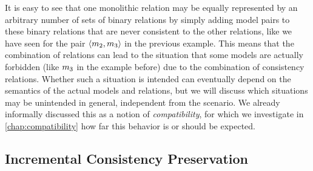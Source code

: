 It is easy to see that one monolithic relation may be equally represented by an arbitrary number of sets of binary relations by simply adding model pairs to these binary relations that are never consistent to the other relations, like we have seen for the pair $\langle m_{2}, m_{3} \rangle$ in the previous example.
This means that the combination of relations can lead to the situation that some models are actually forbidden (like $m_{3}$ in the example before) due to the combination of consistency relations.
Whether such a situation is intended can eventually depend on the semantics of the actual models and relations, but we will discuss which situations may be unintended in general, independent from the scenario.
We already informally discussed this as a notion of \emph{compatibility}, for which we investigate in \autoref{chap:compatibility} how far this behavior is or should be expected.


\subsection{Incremental Consistency Preservation}
\label{chap:correctness:formalization:incremental_inductive}

